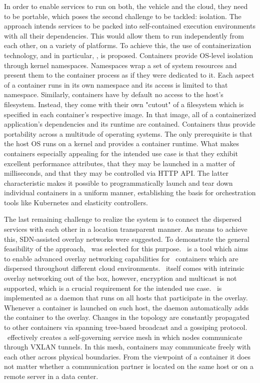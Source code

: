 In order to enable services to run on both, the vehicle and the cloud, they need to be portable, which poses the second challenge to be tackled: isolation. The approach intends services to be packed into self-contained execution environments with all their dependencies. This would allow them to run independently from each other, on a variety of platforms. To achieve this, the use of containerization technology, and in particular, \docker , is proposed. Containers provide OS-level isolation through kernel namespaces. Namespaces wrap a set of system resources and present them to the container process as if they were dedicated to it. Each aspect of a container runs in its own namespace and its access is limited to that namespace. Similarly, containers have by default no access to the host's filesystem. Instead, they come with their own "cutout" of a filesystem which is specified in each container's respective image. In that image, all of a containerized application's dependencies and its runtime are contained. Containers thus provide portability across a multitude of operating systems. The only prerequisite is that the host OS runs on a kernel and provides a container runtime. What makes containers especially appealing for the intended use case is that they exhibit excellent performance attributes, that they may be launched in a matter of milliseconds, and that they may be controlled via HTTP API. The latter characteristic makes it possible to programmatically launch and tear down individual containers in a uniform manner, establishing the basis for orchestration tools like Kubernetes and elasticity controllers.

The last remaining challenge to realize the system is to connect the dispersed services with each other in a location transparent manner. As means to achieve this, SDN-assisted overlay networks were suggested. To demonstrate the general feasibility of the approach, \wnet\ was selected for this purpose. \wnet\ is a tool which aims to enable advanced overlay networking capabilities for \docker\ containers which are dispersed throughout different cloud environments. \docker\ itself comes with intrinsic overlay networking out of the box, however, encryption and multicast is not supported, which is a crucial requirement for the intended use case. \weave\ is implemented as a daemon that runs on all hosts that participate in the overlay. Whenever a container is launched on such host, the daemon automatically adds the container to the overlay. Changes in the topology are constantly propagated to other containers via spanning tree-based broadcast and a gossiping protocol. \weave\ effectively creates a self-governing service mesh in which nodes communicate through VXLAN tunnels. In this mesh, containers may communicate freely with each other across physical boundaries. From the viewpoint of a container it does not matter whether a communication partner is located on the same host or on a remote server in a data center. 

